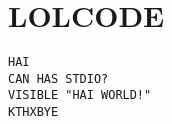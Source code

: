 \chapter{LOLCODE}

{\small
\begin{Verbatim}[frame=single]
HAI
CAN HAS STDIO?
VISIBLE "HAI WORLD!"
KTHXBYE
\end{Verbatim}
}
